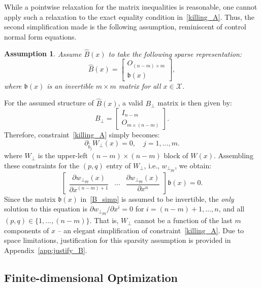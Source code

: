 \documentclass[conference]{svproc}
\newtheorem{assumption}{Assumption}
\newcommand{\X}{\mathcal{X}}
\newcommand{\bs}{\mathfrak{b}}
\begin{document}
While a pointwise relaxation for the matrix inequalities is reasonable, one cannot apply such a relaxation to the exact equality condition in~\eqref{killing_A}. Thus, the second simplification made is the following assumption, reminiscent of control normal form equations.
\begin{assumption}\label{ass:B_simp}
Assume $\hat{B}(x)$ to take the following sparse representation:
\begin{equation}
    \hat{B}(x) = \begin{bmatrix} O_{(n-m)\times m} \\ \bs(x) \end{bmatrix},
\label{B_simp}
\end{equation}
where $\bs(x)$ is an invertible $m\times m$ matrix for all $x\in \X$. 
\end{assumption}
For the assumed structure of $\hat{B}(x)$, a valid $B_{\perp}$ matrix is then given by:
\begin{equation}
    B_{\perp} = \begin{bmatrix} I_{n - m} \\ O_{m \times (n-m)} \end{bmatrix}.
    \label{B_perp}
\end{equation}
Therefore, constraint~\eqref{killing_A} simply becomes:
\[
	\partial_{\hat{b}_j} W_{\perp} (x) = 0, \quad j = 1,\ldots,m.
\]
where $W_{\perp}$ is the upper-left $(n-m)\times (n-m)$ block of $W(x)$. Assembling these constraints for the $(p,q)$ entry of $W_{\perp}$, i.e., $w_{\perp_{pq}}$, we obtain:
\[
	 \begin{bmatrix} \dfrac{ \partial w_{\perp_{pq}} (x) }{\partial x^{(n-m)+1}} & \cdots & \dfrac{\partial w_{\perp_{pq}} (x) }{\partial x^{n}} \end{bmatrix} \bs(x) = 0.
\]
Since the matrix $\bs(x)$ in~\eqref{B_simp} is assumed to be invertible, the \emph{only} solution to this equation is $\partial w_{\perp_{pq}}/ \partial x^i = 0$ for $i = (n-m)+1,\ldots,n$, and all $(p,q) \in \{1,\ldots,(n-m)\}$. That is, $W_{\perp}$ cannot be a function of the last $m$ components of $x$ -- an elegant simplification of constraint~\eqref{killing_A}. Due to space limitations, justification for this sparsity assumption is provided in Appendix~\ref{app:justify_B}.

\subsection{Finite-dimensional Optimization}\label{sec:finite}
\end{document}
